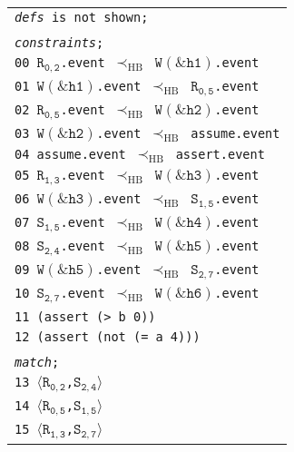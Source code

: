 \newsavebox{\boxSMTa}
\begin{lrbox}{\boxSMTa}
\normalsize
\begin{tabular}[c]{l}
\texttt{\textit{defs} is not shown;}\\
\\
\texttt{\textit{constraints};}\\
\texttt{00 $\mathtt{R_{0,2}}$.event $\mathrm{\prec_{HB}}$ $\mathtt{W(\&h1)}$.event}\\
\texttt{01 $\mathtt{W(\&h1)}$.event $\mathrm{\prec_{HB}}$ $\mathtt{R_{0,5}}$.event}\\
\texttt{02 $\mathtt{R_{0,5}}$.event $\mathrm{\prec_{HB}}$ $\mathtt{W(\&h2)}$.event}\\
\texttt{03 $\mathtt{W(\&h2)}$.event $\mathrm{\prec_{HB}}$ assume.event}\\
\texttt{04 assume.event $\mathrm{\prec_{HB}}$ assert.event}\\
\texttt{05 $\mathtt{R_{1,3}}$.event $\mathrm{\prec_{HB}}$ $\mathtt{W(\&h3)}$.event}\\
\texttt{06 $\mathtt{W(\&h3)}$.event $\mathrm{\prec_{HB}}$ $\mathtt{S_{1,5}}$.event}\\
\texttt{07 $\mathtt{S_{1,5}}$.event $\mathrm{\prec_{HB}}$ $\mathtt{W(\&h4)}$.event}\\
\texttt{08 $\mathtt{S_{2,4}}$.event $\mathrm{\prec_{HB}}$ $\mathtt{W(\&h5)}$.event}\\
\texttt{09 $\mathtt{W(\&h5)}$.event $\mathrm{\prec_{HB}}$ $\mathtt{S_{2,7}}$.event}\\
\texttt{10 $\mathtt{S_{2,7}}$.event $\mathrm{\prec_{HB}}$ $\mathtt{W(\&h6)}$.event}\\
\texttt{11 (assert (> b 0))}\\
\texttt{12 (assert (not (= a 4)))}\\
\\
\texttt{\textit{match};}\\
\texttt{13 $\langle\mathtt{R_{0,2}}$,$\mathtt{S_{2,4}}\rangle$}\\
\texttt{14 $\langle\mathtt{R_{0,5}}$,$\mathtt{S_{1,5}}\rangle$}\\
\texttt{15 $\langle\mathtt{R_{1,3}}$,$\mathtt{S_{2,7}}\rangle$}\\

\end{tabular}
\end{lrbox}

